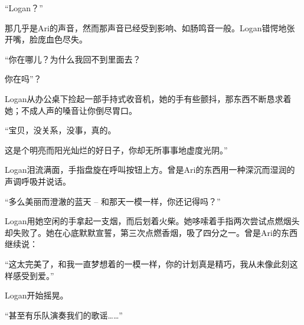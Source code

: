\begin{scpdialog}
“Logan？”
\end{scpdialog}

\begin{scpbox}
那几乎是Ari的声音，然而那声音已经受到影响、如肠鸣音一般。Logan错愕地张开嘴，脸庞血色尽失。
\end{scpbox}

\begin{scpdialog}

“你在哪儿？为什么我回不到里面去？

你在吗”？

\end{scpdialog}


\begin{scpbox}
Logan从办公桌下捡起一部手持式收音机，她的手有些颤抖，那东西不断恳求着她；不成人声的嗓音让你倒尽胃口。
\end{scpbox}

\begin{scpdialog}
“宝贝，没关系，没事，真的。

这是个明亮而阳光灿烂的好日子，你却无所事事地虚度光阴。”
\end{scpdialog}

\begin{scpbox}
Logan泪流满面，手指盘旋在呼叫按钮上方。曾是Ari的东西用一种深沉而湿润的声调呼吸并说话。
\end{scpbox}

\begin{scpdialog}
“多么美丽而澄澈的蓝天 – 和那天一模一样，你还记得吗？”
\end{scpdialog}

\begin{scpbox}
Logan用她空闲的手拿起一支烟，而后划着火柴。她哆嗦着手指两次尝试点燃烟头却失败了。她在心底默默宣誓，第三次点燃香烟，吸了四分之一。曾是Ari的东西继续说：
\end{scpbox}

\begin{scpdialog}
“这太完美了，和我一直梦想着的一模一样，你的计划真是精巧，我从未像此刻这样感受到爱。”
\end{scpdialog}

\begin{scpbox}
Logan开始摇晃。
\end{scpbox}

\begin{scpdialog}
“甚至有乐队演奏我们的歌谣……”
\end{scpdialog}

